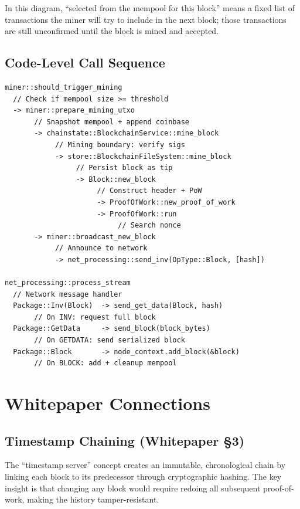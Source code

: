 In this diagram, ``selected from the mempool for this block'' means a fixed list of transactions the miner will try to include in the next block; those transactions are still unconfirmed until the block is mined and accepted.

\subsection{Code-Level Call Sequence}
\label{sec:ch09-6-callseq}

\begin{verbatim}
miner::should_trigger_mining
  // Check if mempool size >= threshold
  -> miner::prepare_mining_utxo
       // Snapshot mempool + append coinbase
       -> chainstate::BlockchainService::mine_block
            // Mining boundary: verify sigs
            -> store::BlockchainFileSystem::mine_block
                 // Persist block as tip
                 -> Block::new_block
                      // Construct header + PoW
                      -> ProofOfWork::new_proof_of_work
                      -> ProofOfWork::run
                           // Search nonce
       -> miner::broadcast_new_block
            // Announce to network
            -> net_processing::send_inv(OpType::Block, [hash])

net_processing::process_stream
  // Network message handler
  Package::Inv(Block)  -> send_get_data(Block, hash)
       // On INV: request full block
  Package::GetData     -> send_block(block_bytes)
       // On GETDATA: send serialized block
  Package::Block       -> node_context.add_block(&block)
       // On BLOCK: add + cleanup mempool
\end{verbatim}

\section{Whitepaper Connections}
\label{sec:ch09-6-whitepaper}

\subsection{Timestamp Chaining (Whitepaper \S3)}
\label{sec:ch09-6-timestamp}

The ``timestamp server'' concept creates an immutable, chronological chain by linking each block to its predecessor through cryptographic hashing. The key insight is that changing any block would require redoing all subsequent proof-of-work, making the history tamper-resistant.

